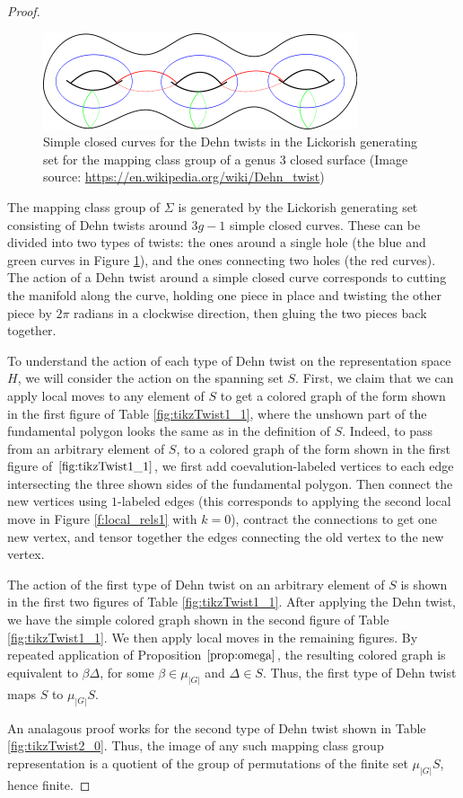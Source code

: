 \documentclass{ws-jktr}
\newcommand{\one}{1}
\newcommand{\Si}{\Sigma}
\begin{document}
\begin{proof}
\begin{figure}
 \centering
 \includegraphics[width=.60\textwidth]{lickorish.png}
 \caption{Simple closed curves for the Dehn twists in the Lickorish generating set for the mapping class group of a genus $3$ closed surface (Image source: \url{https://en.wikipedia.org/wiki/Dehn_twist})}
\label{fig:lickorish}
\end{figure}



The mapping class group of $\Si$ is generated by the Lickorish generating set consisting of Dehn twists around $3g-1$ simple closed curves.   These can be divided into two types of twists: the ones around a single hole (the blue and green curves in Figure \ref{fig:lickorish}), and the ones connecting two holes (the red curves). The action of a Dehn twist around a simple closed curve corresponds to cutting the manifold along the curve, holding one piece in place and twisting the other piece by $2\pi$ radians in a clockwise direction, then gluing the two pieces back together.


To understand the action of each type of Dehn twist on the representation space $H$, we will consider the action on the spanning set $S$.  First, we claim that we can apply local moves to any element of $S$ to get a colored graph of the form shown in the first figure of Table \ref{fig:tikzTwist1_1}, where the unshown part of the fundamental polygon looks the same as in the definition of $S$.  Indeed, to pass from an arbitrary element of $S$, to a colored graph of the form shown in the first figure of $\ref{fig:tikzTwist1_1}$, we first add coevalution-labeled vertices to each  edge intersecting the three shown sides of the fundamental polygon.  Then connect the new vertices using $\one$-labeled edges (this corresponds to applying the second local move in Figure \ref{f:local_rels1} with  $k = 0$), contract the connections to get one new vertex, and tensor together the edges connecting the old vertex to the new vertex.

The action of the first type of Dehn twist on an arbitrary element of $S$ is shown in the first two figures of Table \ref{fig:tikzTwist1_1}.  
After applying the Dehn twist, we have the simple colored graph shown in the second figure of Table \ref{fig:tikzTwist1_1}.  We then apply local moves in the remaining figures.  By repeated application of Proposition $\ref{prop:omega}$, the resulting colored graph is equivalent to $\beta \Delta$, for some $\beta \in \mu_{|G|}$ and  $\Delta \in S$.    Thus, the first type of Dehn twist maps $S$ to $\mu_{|G|} S$.

An analagous proof works for the second type of Dehn twist shown in Table \ref{fig:tikzTwist2_0}. Thus, the image of any such mapping class group representation is a quotient of the group of permutations of the finite set $\mu_{|G|} S$, hence finite.
\end{proof}
\end{document}
